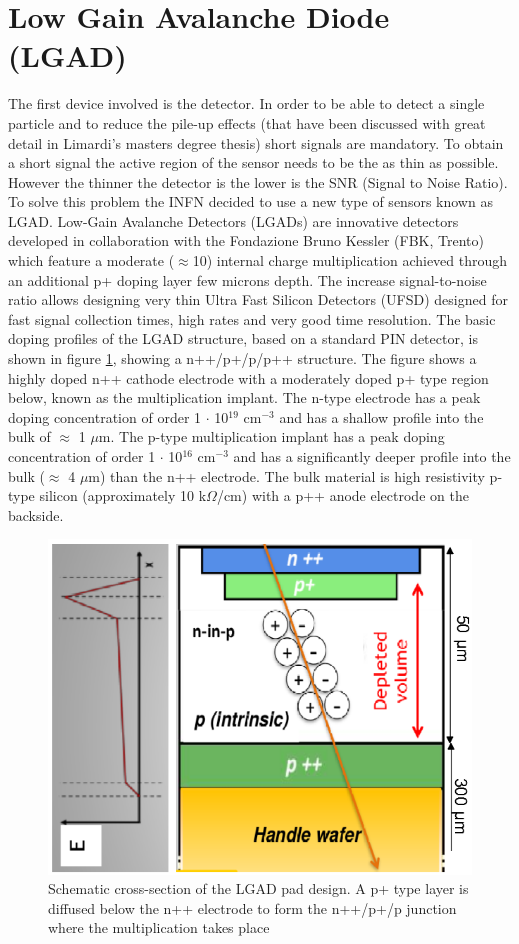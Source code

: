\section{Low Gain Avalanche Diode (LGAD)}\label{lgad}
\noindent The first device involved is the detector. In order to be able to detect a single particle and to reduce the pile-up effects (that have been discussed with great detail in Limardi's masters degree thesis\cite{limardi}) short signals are mandatory. To obtain a short signal the active region of the sensor needs to be the as thin as possible. However the thinner the detector is the lower is the SNR (Signal to Noise Ratio).
To solve this problem the INFN decided to use a new type of sensors known as LGAD.
\noindent Low-Gain Avalanche Detectors (LGADs) are innovative detectors developed in collaboration with the Fondazione Bruno Kessler (FBK, Trento) which feature a moderate ($\approx$10) internal charge multiplication achieved through an additional p+ doping layer few microns depth. The increase signal-to-noise ratio allows designing very thin Ultra Fast Silicon Detectors (UFSD) designed for fast signal collection times, high rates and very good time resolution\cite{lgad}.
The basic doping profiles of the LGAD structure, based on a standard PIN detector, is shown in
figure \ref{fig:ufsdlgad}, showing a n++/p+/p/p++ structure.
The figure shows a highly doped n++ cathode electrode with a moderately doped p+ type region
below, known as the multiplication implant. The n-type electrode has a peak doping concentration
of order 1 $\cdot$ 10$^{19}$ cm$^{-3}$ and has a shallow profile into the bulk of $\approx$ 1 $\mu$m.
The p-type multiplication implant has a peak doping concentration of order 1 $\cdot$ 10$^{16}$ cm$^{-3}$
and has a significantly deeper profile into the bulk ($\approx$ 4 $\mu$m) than the n++ electrode. The bulk
material is high resistivity p-type silicon (approximately 10 k$\Omega$/cm) with a p++ anode electrode
on the backside.
\begin{figure}[H]
	\centering
	\includegraphics[width=0.35\linewidth]{IMG/ch2/UFSDLGAD.png}
	\caption{Schematic cross-section of the LGAD pad design. A p+ type layer is diffused below the n++ electrode to form the n++/p+/p junction where the multiplication takes place}
	\label{fig:ufsdlgad}
\end{figure}
